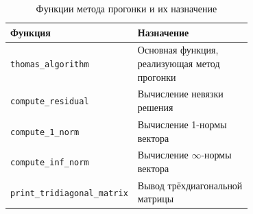 \documentclass[12pt, a4paper]{article}
\begin{document}
\begin{table}[h]
\centering
\caption{Функции метода прогонки и их назначение}
\begin{tabular}{|l|p{0.7\linewidth}|}
\hline
\textbf{Функция} & \textbf{Назначение} \\
\hline
\texttt{thomas\_algorithm} & Основная функция, реализующая метод прогонки \\
\texttt{compute\_residual} & Вычисление невязки решения \\
\texttt{compute\_1\_norm} & Вычисление 1-нормы вектора \\
\texttt{compute\_inf\_norm} & Вычисление $\infty$-нормы вектора \\
\texttt{print\_tridiagonal\_matrix} & Вывод трёхдиагональной матрицы \\
\hline
\end{tabular}
\end{table}
\end{document}
